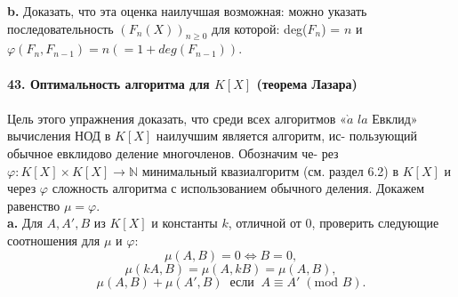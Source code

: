 \hspace*{10pt}\textbf{b.} Доказать, что эта оценка наилучшая возможная: можно указать\linebreak
последовательность $(F_n(X))_{n\geq0}$ для которой: deg($F_n$) = $n$ и\linebreak
$\varphi(F_n , F_{n-1}) = n (= 1 + deg(F_{n-1}))$.
\\
\\
\noindent\textbf{43. Оптимальность алгоритма для $K[X]$ (теорема Лазара)}\\\\
\hspace*{10pt}Цель этого упражнения доказать, что среди всех алгоритмов «$\grave{a}$ $la$\linebreak
Евклид» вычисления НОД в $K[X]$ наилучшим является алгоритм, ис-\linebreak
пользующий обычное евклидово деление многочленов. Обозначим че-\linebreak
рез $\varphi: K[X] \times K[X] \rightarrow \mathbb{N}$ минимальный квазиалгоритм (см. раздел 6.2)\linebreak
в $K[X]$ и через  $\varphi$ сложность алгоритма с использованием обычного\linebreak
деления. Докажем равенство  $\mu=\varphi$.\\
\hspace*{10pt}\textbf{a.} Для $A, A', B$ из $K[X]$ и константы $k$, отличной от 0, проверить\linebreak
следующие соотношения для $\mu$ и $\varphi$:
\begin{equation*}
\mu(A,B)=0\Leftrightarrow B=0,
\end{equation*}
\begin{equation*}
\mu(kA,B)=\mu(A,kB)=\mu(A,B),
\end{equation*}
\begin{equation*}
\mu(A,B)+\mu(A',B)\;\; \text{если}\;\;A\equiv A'\;(\text{mod }B). 
\end{equation*}\pagebreak


